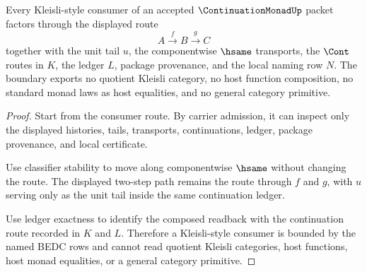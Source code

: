 \begin{theorem}
\label{thm:continuation-monad-kleisli-composition-boundary}
Every Kleisli-style consumer of an accepted $\ContinuationMonadUp$ packet factors through the displayed route
$$
A \xrightarrow{\,f\,} B \xrightarrow{\,g\,} C
$$
together with the unit tail $u$, the componentwise $\hsame$ transports, the $\Cont$ routes in $K$, the ledger $L$, package provenance, and the local naming row $N$. The boundary exports no quotient Kleisli category, no host function composition, no standard monad laws as host equalities, and no general category primitive.
\end{theorem}
\begin{proof}
Start from the consumer route. By carrier admission, it can inspect only the displayed histories, tails, transports, continuations, ledger, package provenance, and local certificate.

Use classifier stability to move along componentwise $\hsame$ without changing the route. The displayed two-step path remains the route through $f$ and $g$, with $u$ serving only as the unit tail inside the same continuation ledger.

Use ledger exactness to identify the composed readback with the continuation route recorded in $K$ and $L$. Therefore a Kleisli-style consumer is bounded by the named BEDC rows and cannot read quotient Kleisli categories, host functions, host monad equalities, or a general category primitive.
\end{proof}

